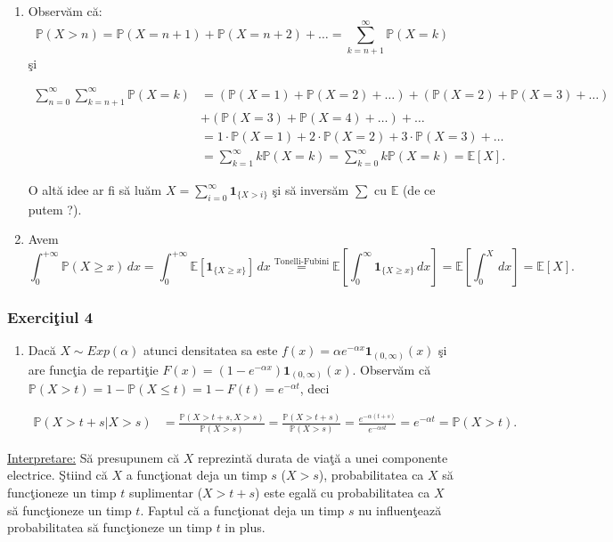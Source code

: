 \documentclass[]{article}
\providecommand{\tightlist}{%
  \setlength{\itemsep}{0pt}\setlength{\parskip}{0pt}}
\def\a{{\alpha}}
\def\1{{\mathbf 1}}
\def\PP{{\mathbb P}}
\def\EE{{\mathbb E}}
\begin{document}
\begin{enumerate}
\def\labelenumi{\alph{enumi})}
\item
  Observ\u am c\u a:
  \[\PP(X>n)=\PP(X=n+1)+\PP(X=n+2)+\dots=\sum_{k=n+1}^{\infty}{\PP(X=k)}\]
  \c si

  \begin{align*}
  \sum_{n=0}^{\infty}{\sum_{k=n+1}^{\infty}{\PP(X=k)}}&=(\PP(X=1)+\PP(X=2)+\dots)+(\PP(X=2)+\PP(X=3)+\dots)\\
    &+(\PP(X=3)+\PP(X=4)+\dots)+\dots\\
    &=1\cdot\PP(X=1)+2\cdot\PP(X=2)+3\cdot\PP(X=3)+\dots\\
    &=\sum_{k=1}^{\infty}{k\PP(X=k)}=\sum_{k=0}^{\infty}{k\PP(X=k)}=\EE[X].
  \end{align*}

  O alt\u a idee ar fi s\u a lu\u am
  \(X=\sum_{i=0}^{\infty}\1_{\{X>i\}}\) \c si s\u a invers\u am \(\sum\)
  cu \(\EE\) (de ce putem ?).
\item
  Avem \[
    \displaystyle\int_{0}^{+\infty}\PP(X\geq x)\, dx = \displaystyle\int_{0}^{+\infty}\EE[\1_{\{X\geq x\}}]\, dx \stackrel{\text{Tonelli-Fubini}}{=} \EE\left[\int_{0}^{\infty}\1_{\{X\geq x\}}\, dx\right] = \EE\left[\int_{0}^{X}\, dx\right] = \EE[X].
  \]
\end{enumerate}

\subsubsection{\texorpdfstring{Exerci\c tiul
4}{Exerciiul 4}}\label{exerciiul-4}

\begin{enumerate}
\def\labelenumi{\alph{enumi})}
\tightlist
\item
  Dac\u a \(X\sim Exp(\a)\) atunci densitatea sa este
  \(f(x) = \a e^{-\a x}\1_{(0,\infty)}(x)\) \c si are func\c tia de
  reparti\c tie \(F(x) = (1-e^{-\a x})\1_{(0,\infty)}(x)\). Observ\u am
  c\u a \(\PP(X>t) = 1-\PP(X\leq t) = 1-F(t) = e^{-\a t}\), deci

  \begin{align*}
  \PP(X>t+s|X>s) &= \frac{\PP(X>t+s,X>s)}{\PP(X>s)} = \frac{\PP(X>t+s)}{\PP(X>s)} = \frac{e^{-\a(t+s)}}{e^{-\a st}} = e^{-\a t} = \PP(X>t).
  \end{align*}
\end{enumerate}

\underline{Interpretare:} S\u a presupunem c\u a \(X\) reprezint\u a
durata de via\c t\u a a unei componente electrice. \c Stiind c\u a \(X\)
a func\c tionat deja un timp \(s\) (\(X>s\)), probabilitatea ca \(X\)
s\u a func\c tioneze un timp \(t\) suplimentar (\(X>t+s\)) este egal\u a
cu probabilitatea ca \(X\) s\u a func\c tioneze un timp \(t\). Faptul
c\u a a func\c tionat deja un timp \(s\) nu influen\c teaz\u a
probabilitatea s\u a func\c tioneze un timp \(t\) in plus.
\end{document}
